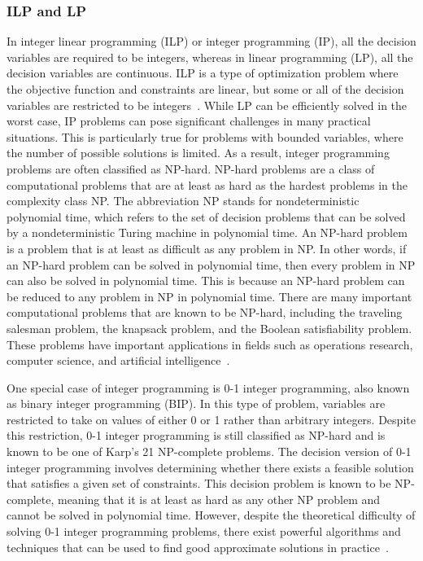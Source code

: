     \subsubsection{ILP and LP}
    In integer linear programming (ILP) or integer programming (IP), all the decision variables are required to be integers, whereas in linear programming (LP), all the decision variables are continuous. ILP is a type of optimization problem where the objective function and constraints are linear, but some or all of the decision variables are restricted to be integers~\cite{vanderbei2020linear}. %
    While LP can be efficiently solved in the worst case, IP problems can pose significant challenges in many practical situations. This is particularly true for problems with bounded variables, where the number of possible solutions is limited. As a result, integer programming problems are often classified as NP-hard. NP-hard problems are a class of computational problems that are at least as hard as the hardest problems in the complexity class NP. The abbreviation NP stands for nondeterministic polynomial time, which refers to the set of decision problems that can be solved by a nondeterministic Turing machine in polynomial time.
    An NP-hard problem is a problem that is at least as difficult as any problem in NP. In other words, if an NP-hard problem can be solved in polynomial time, then every problem in NP can also be solved in polynomial time. This is because an NP-hard problem can be reduced to any problem in NP in polynomial time.
    There are many important computational problems that are known to be NP-hard, including the traveling salesman problem, the knapsack problem, and the Boolean satisfiability problem. These problems have important applications in fields such as operations research, computer science, and artificial intelligence~\cite{fortnow2009status}.

    One special case of integer programming is 0-1 integer programming, also known as binary integer programming (BIP). In this type of problem, variables are restricted to take on values of either 0 or 1 rather than arbitrary integers. Despite this restriction, 0-1 integer programming is still classified as NP-hard and is known to be one of Karp's 21 NP-complete problems. The decision version of 0-1 integer programming involves determining whether there exists a feasible solution that satisfies a given set of constraints. This decision problem is known to be NP-complete, meaning that it is at least as hard as any other NP problem and cannot be solved in polynomial time. However, despite the theoretical difficulty of solving 0-1 integer programming problems, there exist powerful algorithms and techniques that can be used to find good approximate solutions in practice~\cite{vanderbei2020linear, garey1974some}.

